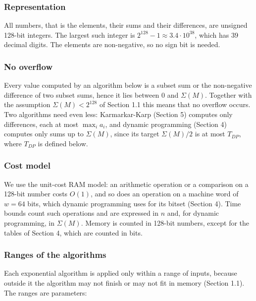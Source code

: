 \documentclass[
]{article}
\begin{document}
\hypertarget{representation}{%
\subsubsection{Representation}\label{representation}}

All numbers, that is the elements, their sums and their differences, are
unsigned 128-bit integers. The largest such integer is
\(2^{128} - 1 \approx 3.4 \cdot 10^{38}\), which has \(39\) decimal
digits. The elements are non-negative, so no sign bit is needed.

\hypertarget{no-overflow}{%
\subsubsection{No overflow}\label{no-overflow}}

Every value computed by an algorithm below is a subset sum or the
non-negative difference of two subset sums, hence it lies between \(0\)
and \(\Sigma(M)\). Together with the assumption \(\Sigma(M) < 2^{128}\)
of Section 1.1 this means that no overflow occurs. Two algorithms need
even less: Karmarkar-Karp (Section 5) computes only differences, each at
most \(\max_i a_i\), and dynamic programming (Section 4) computes only
sums up to \(\Sigma(M)\), since its target \(\Sigma(M)/2\) is at most
\(T_{DP}\), where \(T_{DP}\) is defined below.

\hypertarget{cost-model}{%
\subsubsection{Cost model}\label{cost-model}}

We use the unit-cost RAM model: an arithmetic operation or a comparison
on a 128-bit number costs \(O(1)\), and so does an operation on a
machine word of \(w = 64\) bits, which dynamic programming uses for its
bitset (Section 4). Time bounds count such operations and are expressed
in \(n\) and, for dynamic programming, in \(\Sigma(M)\). Memory is
counted in 128-bit numbers, except for the tables of Section 4, which
are counted in bits.

\hypertarget{ranges-of-the-algorithms}{%
\subsubsection{Ranges of the
algorithms}\label{ranges-of-the-algorithms}}

Each exponential algorithm is applied only within a range of inputs,
because outside it the algorithm may not finish or may not fit in memory
(Section 1.1). The ranges are parameters:
\end{document}
